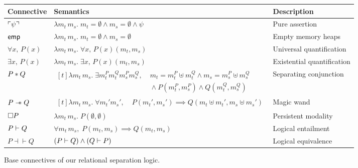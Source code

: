\documentclass[report.tex]{subfiles}
\begin{document}
\begin{figure}[htb]
  \centering
  \begin{tabular}{lll}
    \toprule
    Connective
    & Semantics
    & Description \\
    \midrule
    $\ulcorner \psi \urcorner$
    & $\lambda m_t\, m_s.\; m_t = \emptyset \land m_s = \emptyset \land \psi$
    & Pure assertion \\
    $\textsf{emp}$
    & $\lambda m_t\, m_s.\; m_t = \emptyset \land m_s = \emptyset$
    & Empty memory heaps \\
    $\forall x,\, P(x)$
    & $\lambda m_t\, m_s.\; \forall x,\, P(x)(m_t, m_s)$
    & Universal quantification \\
    $\exists x,\, P(x)$
    & $\lambda m_t\, m_s.\; \exists x,\, P(x)(m_t, m_s)$
    & Existential quantification \\
    $P \mathbin{\ast} Q$
    & $\begin{aligned}[t]
      \lambda m_t\, m_s.\; \exists m_t^P m_t^Q m_s^P m_s^Q,\;
      & m_t = m_t^P \uplus m_t^Q \land m_s = m_s^P \uplus m_s^Q  \\
      & {} \land P(m_t^P, m_s^P) \land Q(m_t^Q, m_s^Q)
      \end{aligned}$
    & Separating conjunction \\
    $P \mathrel{-\mkern-6mu\ast} Q$
    & $\begin{aligned}[t]
        \lambda m_t\, m_s.\; \forall m_t' m_s',\;
        & P(m_t', m_s') \implies Q(m_t \uplus m_t', m_s \uplus m_s')
      \end{aligned}$
    & Magic wand \\
    $\Box P$
    & $\lambda m_t\, m_s.\; P(\emptyset, \emptyset)$
    & Persistent modality \\
    \midrule
    $P \vdash Q$
    & $\forall m_t\, m_s,\; P(m_t, m_s) \implies Q(m_t, m_s)$
    & Logical entailment \\
    $P \dashv\vdash Q$
    & $(P \vdash Q) \land (Q \vdash P)$
    & Logical equivalence \\
    \bottomrule
  \end{tabular}
  \caption{Base connectives of our relational separation logic.}
  \label{fig:rprop-connectives}
\end{figure}
\end{document}
